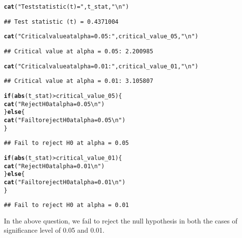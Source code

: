 \documentclass{article}\usepackage[]{graphicx}\usepackage[]{xcolor}
\makeatletter
\newcommand{\hlsng}[1]{\textcolor[rgb]{0.192,0.494,0.8}{#1}}%
\newcommand{\hlopt}[1]{\textcolor[rgb]{0,0,0}{#1}}%
\newcommand{\hldef}[1]{\textcolor[rgb]{0.345,0.345,0.345}{#1}}%
\newcommand{\hlkwa}[1]{\textcolor[rgb]{0.161,0.373,0.58}{\textbf{#1}}}%
\newcommand{\hlkwd}[1]{\textcolor[rgb]{0.737,0.353,0.396}{\textbf{#1}}}%
\newenvironment{kframe}{%
 \def\at@end@of@kframe{}%
 \ifinner\ifhmode%
  \def\at@end@of@kframe{\end{minipage}}%
  \begin{minipage}{\columnwidth}%
 \fi\fi%
 \def\FrameCommand##1{\hskip\@totalleftmargin \hskip-\fboxsep
 \colorbox{shadecolor}{##1}\hskip-\fboxsep
     \hskip-\linewidth \hskip-\@totalleftmargin \hskip\columnwidth}%
 \MakeFramed {\advance\hsize-\width
   \@totalleftmargin\z@ \linewidth\hsize
   \@setminipage}}%
 {\par\unskip\endMakeFramed%
 \at@end@of@kframe}
\newenvironment{knitrout}{}{} %
\makeatother
\begin{document}
\begin{knitrout}
\begin{kframe}
\begin{alltt}
\hlkwd{cat}\hldef{(}\hlsng{"Test statistic (t) ="}\hldef{, t_stat,} \hlsng{"\textbackslash{}n"}\hldef{)}
\end{alltt}
\begin{verbatim}
## Test statistic (t) = 0.4371004
\end{verbatim}
\begin{alltt}
\hlkwd{cat}\hldef{(}\hlsng{"Critical value at alpha = 0.05:"}\hldef{, critical_value_05,} \hlsng{"\textbackslash{}n"}\hldef{)}
\end{alltt}
\begin{verbatim}
## Critical value at alpha = 0.05: 2.200985
\end{verbatim}
\begin{alltt}
\hlkwd{cat}\hldef{(}\hlsng{"Critical value at alpha = 0.01:"}\hldef{, critical_value_01,} \hlsng{"\textbackslash{}n"}\hldef{)}
\end{alltt}
\begin{verbatim}
## Critical value at alpha = 0.01: 3.105807
\end{verbatim}
\begin{alltt}
\hlkwa{if} \hldef{(}\hlkwd{abs}\hldef{(t_stat)} \hlopt{>} \hldef{critical_value_05) \{}
  \hlkwd{cat}\hldef{(}\hlsng{"Reject H0 at alpha = 0.05\textbackslash{}n"}\hldef{)}
\hldef{\}} \hlkwa{else} \hldef{\{}
  \hlkwd{cat}\hldef{(}\hlsng{"Fail to reject H0 at alpha = 0.05\textbackslash{}n"}\hldef{)}
\hldef{\}}
\end{alltt}
\begin{verbatim}
## Fail to reject H0 at alpha = 0.05
\end{verbatim}
\begin{alltt}
\hlkwa{if} \hldef{(}\hlkwd{abs}\hldef{(t_stat)} \hlopt{>} \hldef{critical_value_01) \{}
  \hlkwd{cat}\hldef{(}\hlsng{"Reject H0 at alpha = 0.01\textbackslash{}n"}\hldef{)}
\hldef{\}} \hlkwa{else} \hldef{\{}
  \hlkwd{cat}\hldef{(}\hlsng{"Fail to reject H0 at alpha = 0.01\textbackslash{}n"}\hldef{)}
\hldef{\}}
\end{alltt}
\begin{verbatim}
## Fail to reject H0 at alpha = 0.01
\end{verbatim}
\end{kframe}
\end{knitrout}

In the above question, we fail to reject the null hypothesis in both the cases of significance level of 0.05 and 0.01.
\end{document}
